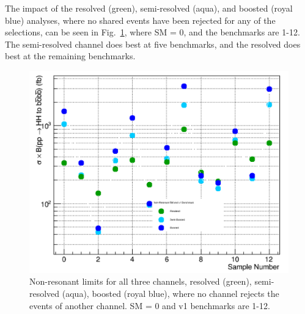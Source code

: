  
The impact of the resolved (green), semi-resolved (aqua), and boosted (royal blue) analyses, where no shared events have been rejected for any of the selections, can be seen in Fig.~\ref{fig:limcompare}, where SM = 0, and the benchmarks are 1-12. The semi-resolved channel does best at five benchmarks, and the resolved does best at the remaining benchmarks. 
\begin{figure}
\centering
\includegraphics[scale=0.5]{F5/NRlimits.pdf}
\caption{Non-resonant limits for all three channels, resolved (green), semi-resolved (aqua), boosted (royal blue), where no channel rejects the events of another channel. SM = 0 and v1 benchmarks are 1-12.}
\label{fig:limcompare}
\end{figure}

